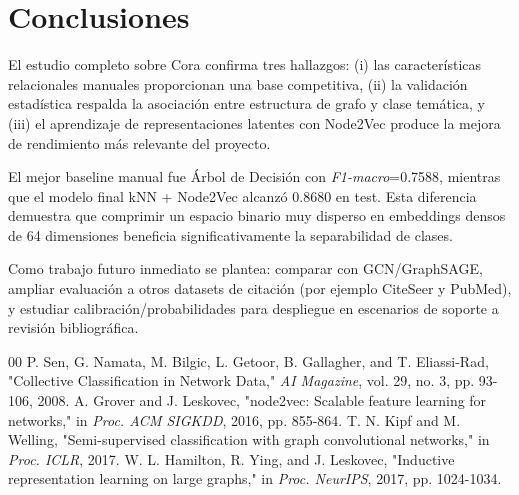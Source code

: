 \documentclass[conference,a4paper]{IEEEtran}
\begin{document}
\section{\textbf{Conclusiones}}

El estudio completo sobre Cora confirma tres hallazgos: (i) las características relacionales manuales
proporcionan una base competitiva, (ii) la validación estadística respalda la asociación entre
estructura de grafo y clase temática, y (iii) el aprendizaje de representaciones latentes con
Node2Vec produce la mejora de rendimiento más relevante del proyecto.

El mejor baseline manual fue Árbol de Decisión con \textit{F1-macro}=0.7588, mientras que el modelo
final kNN + Node2Vec alcanzó 0.8680 en test. Esta diferencia demuestra que comprimir un espacio
binario muy disperso en embeddings densos de 64 dimensiones beneficia significativamente la
separabilidad de clases.

Como trabajo futuro inmediato se plantea: comparar con GCN/GraphSAGE, ampliar evaluación a otros
datasets de citación (por ejemplo CiteSeer y PubMed), y estudiar calibración/probabilidades para
despliegue en escenarios de soporte a revisión bibliográfica.

\begin{thebibliography}{00}
 P. Sen, G. Namata, M. Bilgic, L. Getoor, B. Gallagher, and T. Eliassi-Rad, "Collective Classification in Network Data," \textit{AI Magazine}, vol. 29, no. 3, pp. 93-106, 2008.
 A. Grover and J. Leskovec, "node2vec: Scalable feature learning for networks," in \textit{Proc. ACM SIGKDD}, 2016, pp. 855-864.
 T. N. Kipf and M. Welling, "Semi-supervised classification with graph convolutional networks," in \textit{Proc. ICLR}, 2017.
 W. L. Hamilton, R. Ying, and J. Leskovec, "Inductive representation learning on large graphs," in \textit{Proc. NeurIPS}, 2017, pp. 1024-1034.
\end{thebibliography}
\end{document}
